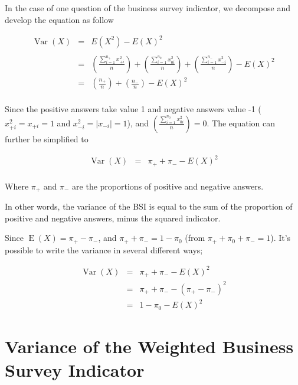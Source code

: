 \documentclass[12pt,a4paper,oneside]{book}
\DeclareMathOperator{\Var}{Var}
\DeclareMathOperator{\E}{E}
\begin{document}
In the case of one question of the business survey indicator, we decompose and develop the equation as follow

\begin{eqnarray}
\Var(X) &=&  E\left( X^2\right) - E\left( X\right)^2 \nonumber \\ \nonumber \\
    &=& \left( \frac{\sum_{i=1}^{n_+} x_{+i}^2}{n} \right)  + \left( \frac{\sum_{i=1}^{n_0} x_{0i}^2}{n} \right) + \left( \frac{\sum_{i=1}^{n_-} x_{-i}^2}{n} \right) - E(X)^2 \\
     &=& \left( \frac{n_+}{n} \right) + \left( \frac{n_-}{n} \right) - E(X)^2 \\ \nonumber
\end{eqnarray}


Since the positive answers take value 1 and negative answers value -1 ($x_{+i}^2 = x_{+i} = 1$ and $x_{-i}^2 = |x_{-i}| = 1$), and $\left( \frac{\sum_{i=1}^{n_0} x_{0i}^2}{n} \right) = 0$. 
The equation can further be simplified to

\begin{eqnarray}
    \Var(X) &=& \pi_+ + \pi_- - E ( X )^2 \label{var1} \\ \nonumber
\end{eqnarray}

Where $\pi_+$ and $\pi_-$ are the proportions of positive and negative answers.

In other words, the variance of the BSI is equal to the sum of the proportion of positive and negative answers, minus the squared indicator.

Since $\E(X)=\pi_+ - \pi_-$, and $\pi_+ + \pi_- = 1 - \pi_0$ (from $\pi_+ + \pi_0 + \pi_- = 1$).
It's possible to write the variance in several different ways;


\begin{eqnarray}
\Var(X) &=& \pi_+ + \pi_- - E ( X )^2  \nonumber \\
        &=& \pi_+ + \pi_- - ( \pi_+ - \pi_- )^2 \label{eq:var2} \\
        &=& 1 - \pi_0 - E(X)^2 \label{eq:var3}
\end{eqnarray}




\section{Variance of the Weighted Business Survey Indicator}
\end{document}
